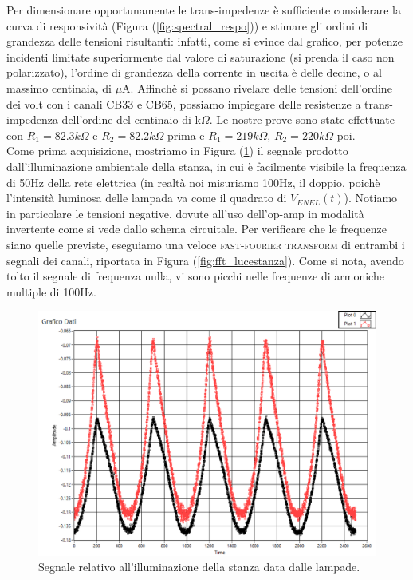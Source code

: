 \documentclass[10pt,letterpaper]{article}
\begin{document}
Per dimensionare opportunamente le trans-impedenze è sufficiente considerare la curva di responsività (Figura (\ref{fig:spectral_respo})) e stimare gli ordini di grandezza delle tensioni risultanti: infatti, come si evince dal grafico, per potenze incidenti limitate superiormente dal valore di saturazione (si prenda il caso non polarizzato), l'ordine di grandezza della corrente in uscita è delle decine, o al massimo centinaia, di $\mu$A. Affinchè si possano rivelare delle tensioni dell'ordine dei volt con i canali \textsc{CB33} e \textsc{CB65}, possiamo impiegare delle resistenze a trans-impedenza dell'ordine del centinaio di k$\Omega$. Le nostre prove sono state effettuate con $R_1 = 82.3 k\Omega$ e $R_2 = 82.2 k\Omega$ prima e $R_1 = 219 k\Omega$, $R_2 = 220 k\Omega$ poi.\\


Come prima acquisizione, mostriamo in Figura (\ref{fig:luce_stanza_enel}) il segnale prodotto dall'illuminazione ambientale della stanza, in cui è facilmente visibile la frequenza di 50Hz della rete elettrica (in realtà noi misuriamo 100Hz, il doppio, poichè l'intensità luminosa delle lampada va come il quadrato di $V_{ENEL}(t)$). Notiamo in particolare le tensioni negative, dovute all'uso dell'op-amp in modalità invertente come si vede dallo schema circuitale. Per verificare che le frequenze siano quelle previste, eseguiamo una veloce \textsc{fast-fourier transform} di entrambi i segnali dei canali, riportata in Figura (\ref{fig:fft_lucestanza}). Come si nota, avendo tolto il segnale di frequenza nulla, vi sono picchi nelle frequenze di armoniche multiple di 100Hz.

\begin{figure}
\centering
\includegraphics[width=0.7\linewidth]{./luce_stanza_enel}
\caption{Segnale relativo all'illuminazione della stanza data dalle lampade.}
\label{fig:luce_stanza_enel}
\end{figure}
\end{document}
